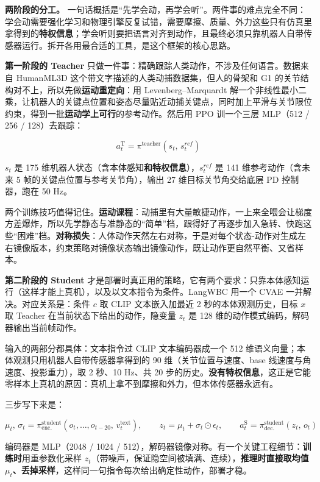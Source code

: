 \documentclass[
  chinese,
]{ctexart}
\begin{document}
\textbf{两阶段的分工。}
一句话概括是``先学会动，再学会听''。两件事的难点完全不同：学会动需要强化学习和物理引擎反复试错，需要摩擦、质量、外力这些只有仿真里拿得到的\textbf{特权信息}；学会听则要把语言对齐到动作，且最终必须只靠机器人自带传感器运行。拆开各用最合适的工具，是这个框架的核心思路。

\textbf{第一阶段的 Teacher}
只做一件事：精确跟踪人类动作，不涉及任何语言。数据来自 HumanML3D
这个带文字描述的人类动捕数据集，但人的骨架和 G1
的关节结构对不上，所以先做\textbf{运动重定向}：用 Levenberg--Marquardt
解一个非线性最小二乘，让机器人的关键点位置和姿态尽量贴近动捕关键点，同时加上平滑与关节限位约束，得到一批\textbf{运动学上可行}的参考动作。然后用
PPO 训一个三层 MLP（512 / 256 / 128）去跟踪：

\[a_t^{\text{T}} = \pi^{\text{teacher}}(s_t,\, s_t^{ref})\]

\(s_t\) 是 175
维机器人状态（含本体感知\textbf{和特权信息}），\(s_t^{ref}\) 是 141
维参考动作（含未来 5 帧的关键点位置与参考关节角），输出 27
维目标关节角交给底层 PD 控制器，跑在 50 Hz。

两个训练技巧值得记住。\textbf{运动课程}：动捕里有大量敏捷动作，一上来全喂会让梯度方差爆炸，所以先学静态与准静态的``简单''档，跟得好了再逐步加入急转、快跑这些``困难''档。\textbf{对称损失}：人体动作天然左右对称，于是对每个状态-动作对生成左右镜像版本，约束策略对镜像状态输出镜像动作，既让动作更自然平衡、又省样本。

\textbf{第二阶段的 Student}
才是部署时真正用的策略，它有两个要求：只靠本体感知运行（这样才能上真机），以及以文本指令为条件。LangWBC
用一个 CVAE 一并解决。对应关系是：条件 \(c\) 取 CLIP 文本嵌入加最近 2
秒的本体观测历史，目标 \(x\) 取 Teacher 在当前状态下给出的动作，隐变量
\(z_t\) 是 128 维的动作模式编码，解码器输出当前帧动作。

输入的两部分都具体：文本指令过 CLIP 文本编码器成一个 512
维语义向量；本体观测只用机器人自带传感器拿得到的 90
维（关节位置与速度、base 线速度与角速度、投影重力），取 2 秒、10 Hz、共
20
步的历史。\textbf{没有特权信息}，这正是它能零样本上真机的原因：真机上拿不到摩擦和外力，但本体传感器永远有。

三步写下来是：

\[\mu_t,\, \sigma_t = \pi^{\text{student}}_{\text{enc.}}(o_t, \ldots, o_{t-20},\, v_t^{\text{text}}), \qquad z_t = \mu_t + \sigma_t \odot \epsilon_t, \qquad a^{\text{S}}_t = \pi^{\text{student}}_{\text{dec.}}(z_t,\, o_t)\]

编码器是 MLP（2048 / 1024 /
512），解码器镜像对称。有一个关键工程细节：\textbf{训练时}用重参数化采样
\(z_t\)（带噪声，保证隐空间被填满、连续），\textbf{推理时直接取均值
\(\mu_t\)、丢掉采样}，这样同一句指令每次给出确定性动作，部署才稳。
\end{document}
